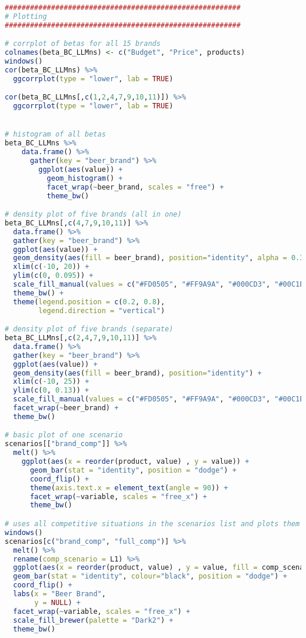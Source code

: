 \begin{lstlisting}[language=R,caption={Plotting correlations, beta densities, histograms, market outcomes, and a price-market share scatterplot}, label=lst_plotting]
########################################################
# Plotting
########################################################

# corrplot of betas for all 15 brands
colnames(beta_BC_LLMns) <- c("Budget", "Price", products)
windows()
cor(beta_BC_LLMns) %>% 
  ggcorrplot(type = "lower", lab = TRUE)

cor(beta_BC_LLMns[,c(1,2,4,7,9,10,11)]) %>% 
  ggcorrplot(type = "lower", lab = TRUE)


# histogram of all betas
beta_BC_LLMns %>% 
    data.frame() %>% 
      gather(key = "beer_brand") %>% 
        ggplot(aes(value)) +
          geom_histogram() +
          facet_wrap(~beer_brand, scales = "free") +
          theme_bw()

# density plot of five brands (all in one)
beta_BC_LLMns[,c(4,7,9,10,11)] %>% 
  data.frame() %>% 
  gather(key = "beer_brand") %>% 
  ggplot(aes(value)) +
  geom_density(aes(fill = beer_brand), position="identity", alpha = 0.3) +
  xlim(c(-10, 20)) +
  ylim(c(0, 0.095)) +
  scale_fill_manual(values = c("#FD0505", "#FF9A9A", "#000CD3", "#00C1EA", "green")) +
  theme_bw() +
  theme(legend.position = c(0.2, 0.8),
        legend.direction = "vertical")

# density plot of five brands (separate)
beta_BC_LLMns[,c(2,4,7,9,10,11)] %>% 
  data.frame() %>% 
  gather(key = "beer_brand") %>% 
  ggplot(aes(value)) +
  geom_density(aes(fill = beer_brand), position="identity") +
  xlim(c(-10, 25)) +
  ylim(c(0, 0.13)) +
  scale_fill_manual(values = c("#FD0505", "#FF9A9A", "#000CD3", "#00C1EA", "green", "grey"), guide = FALSE) +
  facet_wrap(~beer_brand) +
  theme_bw()

# basic plot of one scenario
scenarios[["brand_comp"]] %>% 
  melt() %>% 
    ggplot(aes(x = reorder(product, value) , y = value)) +
      geom_bar(stat = "identity", position = "dodge") +
      coord_flip() +
      theme(axis.text.x = element_text(angle = 90)) +
      facet_wrap(~variable, scales = "free_x") +
      theme_bw()

# uses all competitive situations in the scenarios list and plots them side by side
windows()
scenarios[c("brand_comp", "full_comp")] %>% 
  melt() %>% 
  rename(comp_scenario = L1) %>% 
  ggplot(aes(x = reorder(product, value) , y = value, fill = comp_scenario)) +
  geom_bar(stat = "identity", colour="black", position = "dodge") +
  coord_flip() +
  labs(x = "Beer Brand",
       y = NULL) +
  facet_wrap(~variable, scales = "free_x") +
  scale_fill_brewer(palette = "Dark2") +
  theme_bw()


\end{lstlisting}
